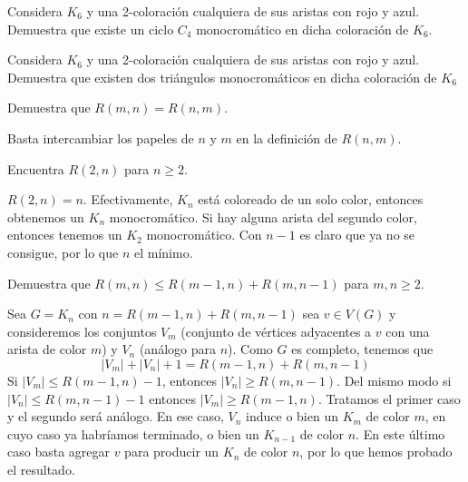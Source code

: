 \documentclass[twoside]{article}
\begin{document}
\newpage

\begin{ejercicio}{2.5}

Considera $K_6$ y una 2-coloración cualquiera de sus aristas con rojo y azul. Demuestra que
existe un ciclo $C_4$ monocromático en dicha coloración de $K_6$.
\end{ejercicio}
\begin{solucion}
 
\end{solucion}

\newpage

\begin{ejercicio}{2.6}
Considera $K_6$ y una 2-coloración cualquiera de sus aristas con rojo y azul. Demuestra que
existen dos triángulos monocromáticos en dicha coloración de $K_6$
\end{ejercicio}
\begin{solucion}

\end{solucion}

\newpage

\begin{ejercicio}{2.7}
Demuestra que $R(m, n) = R(n, m)$.
\end{ejercicio}
\begin{solucion}
Basta intercambiar los papeles de $n$ y $m$ en la definición de $R(n,m)$. 
\end{solucion}

\newpage

\begin{ejercicio}{2.8}
Encuentra $R(2, n)$ para $n ≥ 2$.
\end{ejercicio}
\begin{solucion}


$R(2,n)=n$. Efectivamente, $K_n$ está coloreado de un solo color, entonces obtenemos un $K_n$ monocromático. Si hay alguna arista del segundo color, entonces tenemos un $K_2$ monocromático. Con $n-1$ es claro que ya no se consigue, por lo que $n$ el mínimo.


\end{solucion}
\newpage

\begin{ejercicio}{2.9}
Demuestra que $R(m, n) ≤ R(m − 1, n) + R(m, n − 1)$ para $m, n ≥ 2$.
\end{ejercicio}
\begin{solucion}
Sea $G=K_n$ con $n=R(m − 1, n) + R(m, n − 1)$ sea $v\in V(G)$ y consideremos los conjuntos $V_m$ (conjunto de vértices adyacentes a $v$ con una arista de color $m$) y $V_n$ (análogo para $n$). Como $G$ es completo, tenemos que 
\[
|V_m|+|V_n|+1=R(m-1,n)+R(m,n-1)
\] 
Si $|V_m|\leq R(m-1,n)-1$, entonces $|V_n|\geq R(m,n-1)$. Del mismo modo si $|V_n|\leq R(m,n-1)-1$ entonces $|V_m|\geq R(m-1,n)$. Tratamos el primer caso y el segundo será análogo. En ese caso, $V_n$ induce o bien un $K_m$ de color $m$, en cuyo caso ya habríamos terminado, o bien un $K_{n-1}$ de color $n$. En este último caso basta agregar $v$ para producir un $K_n$ de color $n$, por lo que hemos probado el resultado. 
\end{solucion}
\end{document}

